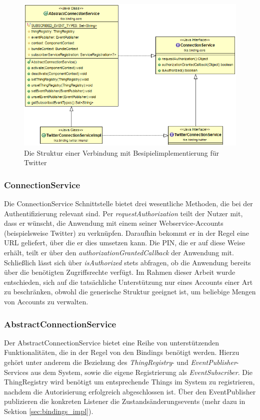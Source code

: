 \begin{figure}[h]
	\centering
	\includegraphics[width=\textwidth]{bilder/ConnectionService}
	\caption{Die Struktur einer Verbindung mit Besipielimplementierung für Twitter}
	\label{fig:connectionservice}
\end{figure}

\subsubsection{ConnectionService}
Die ConnectionService Schnittstelle bietet drei wesentliche Methoden, die bei der Authentifizierung relevant sind. Per \textit{requestAuthorization} teilt der Nutzer mit, dass er wünscht, die Anwendung mit einem seiner Webservice-Accounts (beispielsweise Twitter) zu verknüpfen. Daraufhin bekommt er in der Regel eine URL geliefert, über die er dies umsetzen kann. Die PIN, die er auf diese Weise erhält, teilt er über den \textit{authorizationGrantedCallback} der Anwendung mit. Schließlich lässt sich über \textit{isAuthorized} stets abfragen, ob die Anwendung bereits über die benötigten Zugriffsrechte verfügt. Im Rahmen dieser Arbeit wurde entschieden, sich auf die tatsächliche Unterstützung nur eines Accounts einer Art zu beschränken, obwohl die generische Struktur geeignet ist, um beliebige Mengen von Accounts zu verwalten.

\subsubsection{AbstractConnectionService}
Der AbstractConnectionService bietet eine Reihe von unterstützenden Funktionalitäten, die in der Regel von den Bindings benötigt werden. Hierzu gehört unter anderem die Beziehung des \textit{ThingRegistry}- und \textit{EventPublisher}-Services aus dem System, sowie die eigene Registrierung als \textit{EventSubscriber}. Die ThingRegistry wird benötigt um entsprechende Things im System zu registrieren, nachdem die Autorisierung erfolgreich abgeschlossen ist. Über den EventPublisher publizieren die konkreten Listener die Zustandsänderungsevents (mehr dazu in Sektion \ref{sec:bindings_impl}).\\



